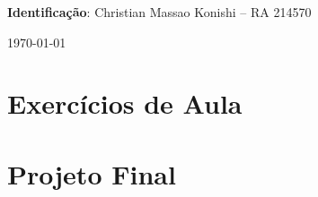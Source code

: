 \documentclass[11pt,letter]{report}
\begin{document}
	\begin{spacing}{1.3}
		\setcounter{page}{1}
		\noindent \textbf{Identificação}: Christian Massao Konishi -- RA 214570\\
		
		\vspace{1cm}
		
		
		\vspace*{\fill}
		
		\centerline{\today}
		
		\newpage
		
		\chapter{Exercícios de Aula}
		
		
		
		\chapter{Projeto Final}
		
		
		
		
		
	\end{spacing}
	
	\vfill
	
\end{document}
